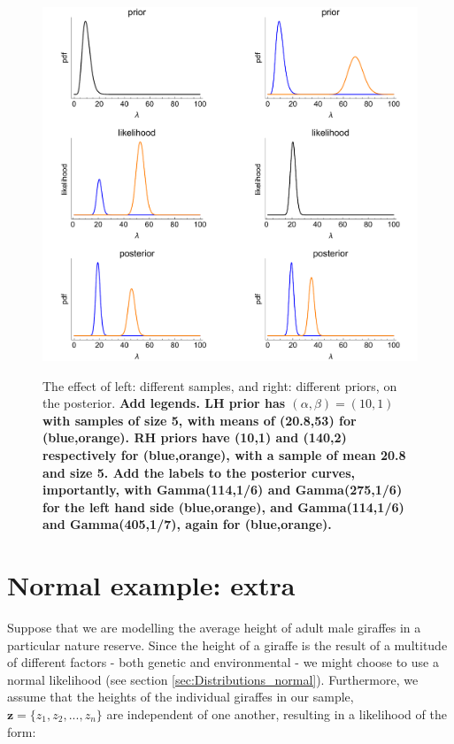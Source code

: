 \documentclass[11pt,fullpage]{book}
\begin{document}
\begin{figure}
\centering
\scalebox{0.3} 
{\includegraphics{Conjugate_poissonGamma.pdf}}
\caption{The effect of left: different samples, and right: different priors, on the posterior. \textbf{Add legends. LH prior has $(\alpha,\beta)= (10,1)$ with samples of size 5, with means of (20.8,53) for (blue,orange). RH priors have (10,1) and (140,2) respectively for (blue,orange), with a sample of mean 20.8 and size 5. Add the labels to the posterior curves, importantly, with Gamma(114,1/6) and Gamma(275,1/6) for the left hand side (blue,orange), and Gamma(114,1/6) and Gamma(405,1/7), again for (blue,orange).}}\label{fig:Conjugate_poissonGamma}
\end{figure}

\section{Normal example: extra}\label{sec:conjugate_normal}
Suppose that we are modelling the average height of adult male giraffes in a particular nature reserve. Since the height of a giraffe is the result of a multitude of different factors - both genetic and environmental - we might choose to use a normal likelihood (see section \ref{sec:Distributions_normal}). Furthermore, we assume that the heights of the individual giraffes in our sample, $\boldsymbol{z} = \{z_1,z_2,...,z_n\}$ are independent of one another, resulting in a likelihood of the form:
\end{document}
